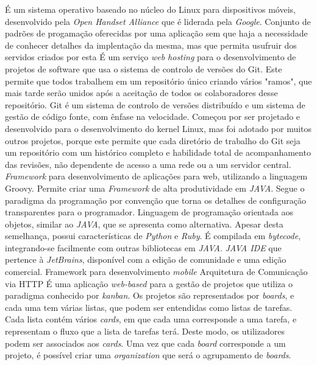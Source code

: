 \begin{glossary}
É um sistema operativo baseado no núcleo do Linux para dispositivos móveis, desenvolvido pela \textit{Open Handset Alliance} que é liderada pela \textit{Google}.
 {Conjunto de padrões de progamação oferecidas por uma aplicação sem que haja a necessidade de conhecer detalhes da implentação da mesma, mas que permita usufruir dos servidos criados por esta}
É um serviço \textit{web hosting} para o desenvolvimento de projetos de software que usa o sistema de controlo de versões do Git. Este permite que todos trabalhem em um repositório único criando vários "ramos", que mais tarde serão unidos após a aceitação de todos os colaboradores desse repositório.
Git é um sistema de controlo de versões distribuído e um sistema de gestão de código fonte, com ênfase na velocidade. Começou por ser projetado e desenvolvido para o desenvolvimento do kernel Linux, mas foi adotado por muitos outros projetos, porque este permite que cada diretório de trabalho do Git seja um repositório com um histórico completo e habilidade total de acompanhamento das revisões, não dependente de acesso a uma rede ou a um servidor central.
\textit{Framework} para desenvolvimento de aplicações para web, utilizando a linguagem Groovy. Permite criar uma \textit{Framework} de alta produtividade em \textit{JAVA}. Segue o paradigma da programação por convenção que torna os detalhes de configuração transparentes para o programador.
Linguagem de programação orientada aos objetos, similar ao \textit{JAVA}, que se apresenta como alternativa. Apesar desta semelhança, possui características de \textit{Python} e \textit{Ruby}. É compilada em \textit{bytecode}, integrando-se facilmente com outras bibliotecas em \textit{JAVA}.
\textit{JAVA IDE} que pertence à \textit{JetBrains}, disponível com a edição de comunidade e uma edição comercial.
 Framework para desenvolvimento \emph{mobile}
 Arquitetura de Comunicação via HTTP
É uma aplicação \textit{web-based} para a gestão de projetos que utiliza o paradigma conhecido por \textit{kanban}. Os projetos são representados por \textit{boards}, e cada uma tem várias listas, que podem ser entendidas como listas de tarefas. Cada lista contém vários \textit{cards}, em que cada uma corresponde a uma tarefa, e representam o fluxo que a lista de tarefas terá. Deste modo, os utilizadores podem ser associados aos \textit{cards}. Uma vez que cada \textit{board} corresponde a um projeto, é possível criar uma \textit{organization} que será o agrupamento de \textit{boards}.
\end{glossary}
